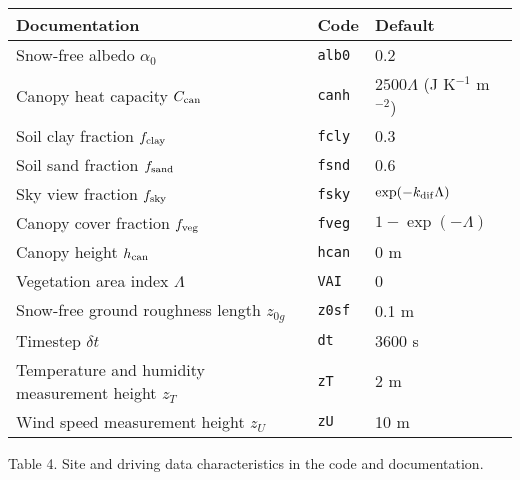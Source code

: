 \documentclass{article}
\begin{document}
\vskip20pt
\begin{tabular}{|l|l|l|}
\hline
Documentation & Code & Default \\
\hline
Snow-free albedo $\alpha_0$ & {\tt alb0} & 0.2 \\
Canopy heat capacity $C_{\rm can}$ & {\tt canh} & $2500\Lambda$ (J K$^{-1}$ m$^{-2}$) \\
Soil clay fraction $f_{\rm clay}$ & {\tt fcly} & 0.3 \\
Soil sand fraction $f_{\rm sand}$ & {\tt fsnd} & 0.6 \\
Sky view fraction $f_{\rm sky}$ & {\tt fsky} & $\exp(-k_{\rm dif}\Lambda)$ \\
Canopy cover fraction $f_{\rm veg}$ & {\tt fveg} & $1 - \exp(-\Lambda)$ \\
Canopy height $h_{\rm can}$ & {\tt hcan} & 0 m \\
Vegetation area index $\Lambda$ & {\tt VAI} & 0 \\
Snow-free ground roughness length $z_{0g}$ & {\tt z0sf} & 0.1 m \\
Timestep $\delta t$ & {\tt dt} & 3600 s \\
Temperature and humidity measurement height $z_T$ & {\tt zT} & 2 m  \\
Wind speed measurement height $z_U$ & {\tt zU} & 10 m  \\
\hline 
\end{tabular}

Table 4. Site and driving data characteristics in the code and documentation.
\end{document}
